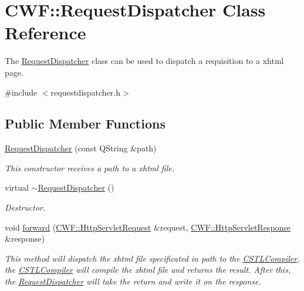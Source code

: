 \hypertarget{class_c_w_f_1_1_request_dispatcher}{\section{C\+W\+F\+:\+:Request\+Dispatcher Class Reference}
\label{class_c_w_f_1_1_request_dispatcher}
}


The \hyperlink{class_c_w_f_1_1_request_dispatcher}{Request\+Dispatcher} class can be used to dispatch a requisition to a xhtml page.  




{\ttfamily \#include $<$requestdispatcher.\+h$>$}

\subsection*{Public Member Functions}
\begin{DoxyCompactItemize}
\item 
\hyperlink{class_c_w_f_1_1_request_dispatcher_a165259f215b920a52573dbc37c3985f2}{Request\+Dispatcher} (const Q\+String \&path)
\begin{DoxyCompactList}\small\item\em This constructor receives a path to a xhtml file. \end{DoxyCompactList}\item 
virtual \hyperlink{class_c_w_f_1_1_request_dispatcher_a668e801a8b718373e9e886c613ed54ad}{$\sim$\+Request\+Dispatcher} ()
\begin{DoxyCompactList}\small\item\em Destructor. \end{DoxyCompactList}\item 
void \hyperlink{class_c_w_f_1_1_request_dispatcher_a075c11ff233f217196764899f9edf7d0}{forward} (\hyperlink{class_c_w_f_1_1_http_servlet_request}{C\+W\+F\+::\+Http\+Servlet\+Request} \&request, \hyperlink{class_c_w_f_1_1_http_servlet_response}{C\+W\+F\+::\+Http\+Servlet\+Response} \&response)
\begin{DoxyCompactList}\small\item\em This method will dispatch the xhtml file specificated in path to the \hyperlink{class_c_w_f_1_1_c_s_t_l_compiler}{C\+S\+T\+L\+Compiler}, the \hyperlink{class_c_w_f_1_1_c_s_t_l_compiler}{C\+S\+T\+L\+Compiler} will compile the xhtml file and returns the result. After this, the \hyperlink{class_c_w_f_1_1_request_dispatcher}{Request\+Dispatcher} will take the return and write it on the response. \end{DoxyCompactList}\end{DoxyCompactItemize}


